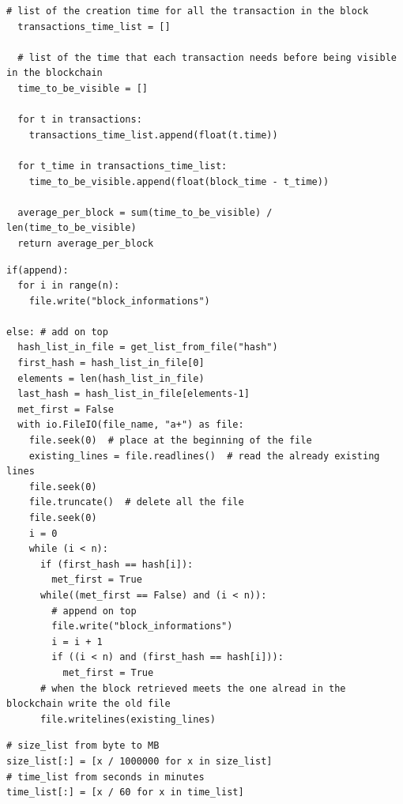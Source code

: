 \documentclass[USenglish]{uit-thesis}
\begin{document}
\begin{appendices}
\begin{lstlisting}[float, caption={Function that get the average write bandwidth of the block, calculating the time for each transaction to be visible in the public ledger of data.}]
  # list of the creation time for all the transaction in the block
  transactions_time_list = []

  # list of the time that each transaction needs before being visible in the blockchain
  time_to_be_visible = []

  for t in transactions:
    transactions_time_list.append(float(t.time))

  for t_time in transactions_time_list:
    time_to_be_visible.append(float(block_time - t_time))
    
  average_per_block = sum(time_to_be_visible) / len(time_to_be_visible)
  return average_per_block
\end{lstlisting}

\begin{lstlisting}[float, caption={How the file.write is performed in the blockchain analytics system. Differences with add and append.}]
if(append):
  for i in range(n):
    file.write("block_informations")

else: # add on top
  hash_list_in_file = get_list_from_file("hash")
  first_hash = hash_list_in_file[0]
  elements = len(hash_list_in_file)
  last_hash = hash_list_in_file[elements-1]
  met_first = False
  with io.FileIO(file_name, "a+") as file:
    file.seek(0)  # place at the beginning of the file
    existing_lines = file.readlines()  # read the already existing lines
    file.seek(0)
    file.truncate()  # delete all the file
    file.seek(0)
    i = 0
    while (i < n):
      if (first_hash == hash[i]):
        met_first = True
      while((met_first == False) and (i < n)):
        # append on top
        file.write("block_informations")
        i = i + 1
        if ((i < n) and (first_hash == hash[i])):
          met_first = True
      # when the block retrieved meets the one alread in the blockchain write the old file
      file.writelines(existing_lines)

\end{lstlisting}

\begin{lstlisting}[float, caption={Changing all the values inside a Python list in one code line.}]
# size_list from byte to MB
size_list[:] = [x / 1000000 for x in size_list]
# time_list from seconds in minutes
time_list[:] = [x / 60 for x in time_list]
\end{lstlisting}



\end{appendices}
\end{document}
